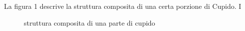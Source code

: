 
La figura 1 descrive la struttura composita di una certa porzione di Cupido. I

\begin{center}
  \begin{figure}[ht]
    \begin{center}
    \end{center}
    \caption{struttura composita di una parte di cupido}
    \label{fig:example}
  \end{figure}
\end{center}